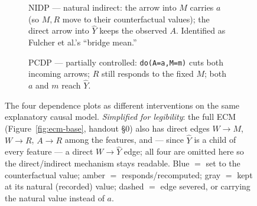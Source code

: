 \begin{figure}[htbp]
\begin{subfigure}[t]{0.47\textwidth}
\centering
{}
\caption{NIDP --- natural indirect: the arrow into $M$ carries $a$ (so $M,R$
move to their counterfactual values); the direct arrow into $\hat Y$ keeps
the observed $A$. Identified as Fulcher et al.'s ``bridge mean.''}
\label{fig:nidp}
\end{subfigure}
\hfill
\begin{subfigure}[t]{0.47\textwidth}
\centering
{}
\caption{PCDP --- partially controlled: \texttt{do(A=a,M=m)} cuts both
incoming arrows; $R$ still responds to the fixed $M$; both $a$ and $m$ reach
$\hat Y$.}
\label{fig:pcdp}
\end{subfigure}
\caption{The four dependence plots as different interventions on the same
explanatory causal model. \emph{Simplified for legibility}: the full ECM
(Figure~\ref{fig:ecm-base}, handout \S0) also has direct edges $W\to M$,
$W \to R$, $A \to R$ among the features, and --- since $\hat Y$ is a child
of every feature --- a direct $W \to \hat Y$ edge; all four are omitted here
so the direct/indirect mechanism stays readable. Blue $=$ set to the
counterfactual value; amber $=$ responds/recomputed; gray $=$ kept at its
natural (recorded) value; dashed $=$ edge severed, or carrying the natural
value instead of $a$.}
\label{fig:four-plots}
\end{figure}

